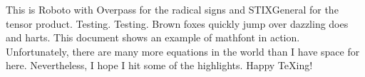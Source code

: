 \documentclass[12pt]{article}
\begin{document}
\let\footnote\@gobble
\def\showabstract{0}
\let\textsf\relax
\let\ttfamily\relax
\def\documentname{Example---Roboto}



This is Roboto with Overpass for the radical signs and STIXGeneral for the tensor product. Testing. Testing. Brown foxes quickly jump over dazzling does and harts. This document shows an example of mathfont in action. Unfortunately, there are many more equations in the world than I have space for here. Nevertheless, I hope I hit some of the highlights. Happy \TeX ing!


\end{document}
